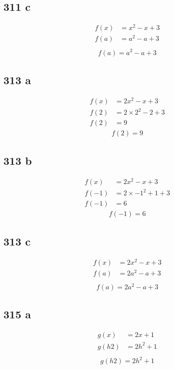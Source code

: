 \documentclass{article}
\begin{document}
    \subsection*{311 c}
    \begin{align*}
        f(x) &= x^2 - x +3 \\
        f(a) &= a^2 - a + 3\\
    \end{align*}
    \begin{align*}
        \boxed{f(a) = a^2 - a + 3}
    \end{align*}

    \subsection*{313 a}
    \begin{align*}
        f(x) &= 2x^2 - x +3 \\
        f(2) &= 2 \times 2^2  - 2 + 3\\
        f(2) &= 9
    \end{align*}
    \begin{align*}
        \boxed{f(2) = 9}
    \end{align*}

    \subsection*{313 b}
    \begin{align*}
        f(x) &= 2x^2 - x +3 \\
        f(-1) &= 2 \times -1^2 + 1 +3\\
        f(-1) &= 6
    \end{align*}
    \begin{align*}
        \boxed{f(-1) = 6}
    \end{align*}

    \subsection*{313 c}
    \begin{align*}
        f(x) &= 2x^2 - x +3 \\
        f(a) &= 2a^2 - a + 3\\
    \end{align*}
    \begin{align*}
        \boxed{f(a) = 2a^2 - a + 3}
    \end{align*}

    \subsection*{315 a}
    \begin{align*}
        g(x) &= 2x +1 \\
        g(h2) &= 2h^2  +1\\
    \end{align*}
    \begin{align*}
        \boxed{g(h2) = 2h^2  +1}
    \end{align*}
\end{document}

